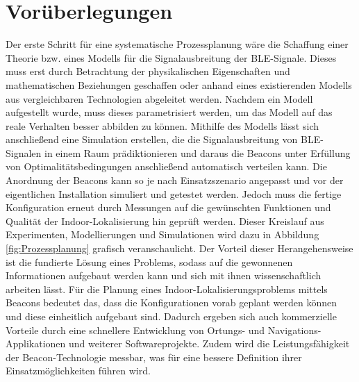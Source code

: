 \section{Vorüberlegungen}
Der erste Schritt für eine systematische Prozessplanung wäre die Schaffung einer Theorie bzw. eines Modells für die Signalausbreitung der BLE-Signale. Dieses muss erst durch Betrachtung der physikalischen Eigenschaften und mathematischen Beziehungen geschaffen oder anhand eines existierenden Modells aus vergleichbaren Technologien abgeleitet werden. Nachdem ein Modell aufgestellt wurde, muss dieses parametrisiert werden, um das Modell auf das reale Verhalten besser abbilden zu können. Mithilfe des Modells lässt sich anschließend eine Simulation erstellen, die die Signalausbreitung von BLE-Signalen in einem Raum prädiktionieren und daraus die Beacons unter Erfüllung von Optimalitätsbedingungen anschließend automatisch verteilen kann. Die Anordnung der Beacons kann so je nach Einsatzszenario angepasst und vor der eigentlichen Installation simuliert und getestet werden. Jedoch muss die fertige Konfiguration erneut durch Messungen auf die gewünschten Funktionen und Qualität der Indoor-Lokalisierung hin geprüft werden. Dieser Kreislauf aus Experimenten, Modellierungen und Simulationen wird dazu in Abbildung \ref{fig:Prozessplanung} grafisch veranschaulicht. Der Vorteil dieser Herangehensweise ist die fundierte Lösung eines Problems, sodass auf die gewonnenen Informationen aufgebaut werden kann und sich mit ihnen wissenschaftlich arbeiten lässt. Für die Planung eines Indoor-Lokalisierungsproblems mittels Beacons bedeutet das, dass die Konfigurationen vorab geplant werden können und diese einheitlich aufgebaut sind. Dadurch ergeben sich auch kommerzielle Vorteile durch eine schnellere Entwicklung von Ortungs- und Navigations-Applikationen und weiterer Softwareprojekte. Zudem wird die Leistungsfähigkeit der Beacon-Technologie messbar, was für eine bessere Definition ihrer Einsatzmöglichkeiten führen wird.
